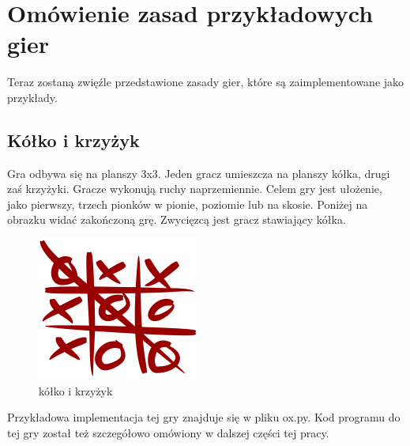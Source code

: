 \documentclass[declaration,shortabstract,inz]{iithesis}
\begin{document}
\section{Omówienie zasad przykładowych gier}
Teraz zostaną zwięźle przedstawione zasady gier, które są zaimplementowane jako przykłady.
\subsection{Kółko i krzyżyk}
Gra odbywa się na planszy 3x3. Jeden gracz umieszcza na planszy kółka, drugi zaś krzyżyki.
Gracze wykonują ruchy naprzemiennie. Celem gry jest ułożenie, jako pierwszy, trzech pionków w pionie, poziomie lub na skosie.
Poniżej na obrazku widać zakończoną grę. Zwycięzcą jest gracz stawiający kółka.
\begin{figure}[H]
  \includegraphics{./images/tictactoe.png}
  \centering
  \caption{kółko i krzyżyk}
  \label{fig:ox}
\end{figure}

Przykładowa implementacja tej gry znajduje się w pliku ox.py.
Kod programu do tej gry został też szczegółowo omówiony w dalszej części tej pracy.
\end{document}
